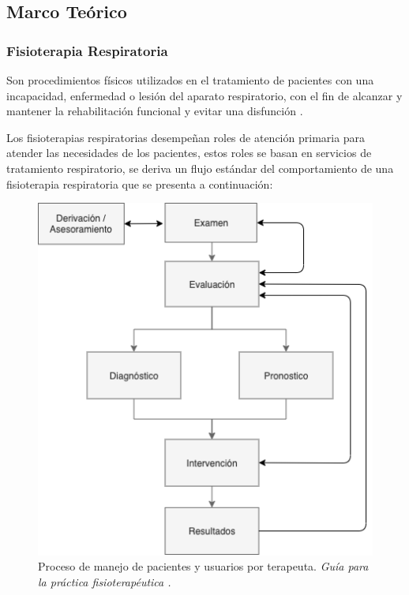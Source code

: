 \documentclass[12pt]{article}
\begin{document}
\subsection{Marco Teórico}

\subsubsection{Fisioterapia Respiratoria}

Son procedimientos físicos utilizados en el tratamiento de pacientes con una incapacidad, enfermedad o lesión del aparato respiratorio, con el fin de alcanzar y mantener la rehabilitación funcional y evitar una disfunción \cite{26}.


Los fisioterapias respiratorias desempeñan roles de atención primaria para atender las necesidades de los pacientes, estos roles se basan en  servicios de tratamiento respiratorio, se deriva un flujo estándar del comportamiento de una fisioterapia respiratoria que se presenta a continuación:

\begin{figure}[ht]
\centering
\includegraphics[scale=0.45]{imag/C4-Terapeuta.png}
\caption{Proceso de manejo de pacientes y usuarios por terapeuta. \textit{Guía para la práctica fisioterapéutica \cite{5}.}}
\label{2}
\end{figure}
\FloatBarrier
\end{document}
